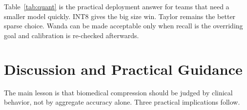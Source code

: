 \documentclass{article}
\begin{document}
\begin{table}[t]
\centering
\small
\caption{Selected deployment summary from the multi-seed personal quantization run. Quantization preserves the dense behavior closely, but the pruning criterion still determines the downstream clinical tradeoff. Size is reported because it is the primary deployment win; latency is backend-dependent and therefore discussed separately in the appendix.}
\label{tab:quant}
\end{table}

Table~\ref{tab:quant} is the practical deployment answer for teams that need a smaller model quickly. INT8 gives the big size win. Taylor remains the better sparse choice. Wanda can be made acceptable only when recall is the overriding goal and calibration is re-checked afterwards.

\section{Discussion and Practical Guidance}
The main lesson is that biomedical compression should be judged by clinical behavior, not by aggregate accuracy alone. Three practical implications follow.
\end{document}
